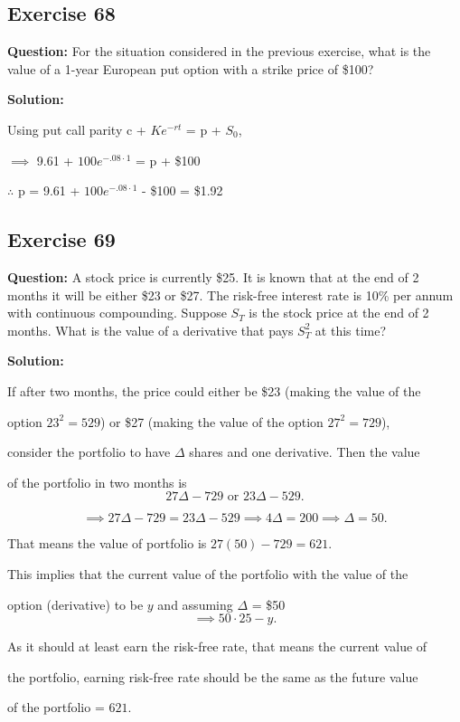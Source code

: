 \documentclass{article}
\begin{document}
\subsection*{Exercise 68}
\textbf{Question:} For the situation considered in the previous exercise, what is the value of a 1-year European put option with a strike price of \$100?

\textbf{Solution:}

Using put call parity c + $Ke^{-rt}$ = p + $S_0$,

$\implies$ 9.61 + $100e^{-.08 \cdot 1}$ = p + \$100

$\therefore$ p = 9.61 + $100e^{-.08 \cdot 1}$ - \$100 = \$1.92

\subsection*{Exercise 69}
\textbf{Question:} A stock price is currently \$25. It is known that at the end of 2 months it will be either \$23 or \$27.
The risk-free interest rate is 10\% per annum with continuous compounding. Suppose $S_T$ is the stock price at the
end of 2 months. What is the value of a derivative that pays $S_T^{2}$ at this time?

\textbf{Solution:}

If after two months, the price could either be \$23 (making the value of the 

option $23^2 = 529$) or \$27 (making the value of the option $27^2 = 729$), 

consider the portfolio to have $\Delta$ shares and one derivative. Then the value 

of the portfolio in two months is
\[
27\Delta - 729 \text{ or } 23\Delta - 529.
\]

\[
\implies 27\Delta - 729 = 23\Delta - 529 \implies 4\Delta = 200 \implies \Delta = 50.
\]

That means the value of portfolio is $27(50) - 729 = 621$.

This implies that the current value of the portfolio with the value of the 

option (derivative) to be $y$ and assuming $\Delta$ = \$50
\[
\implies 50 \cdot 25 - y.
\]

As it should at least earn the risk-free rate, that means the current value of 

the portfolio, earning risk-free rate should be the same as the future value 

of the portfolio = $621$.
\end{document}

